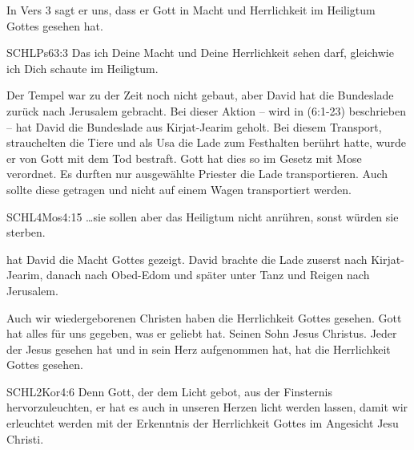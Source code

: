 \documentclass[14pt]{../../inc/mybib}
\begin{document}
    \begin{block}
        In Vers 3 sagt er uns, dass er Gott in Macht und Herrlichkeit im Heiligtum Gottes gesehen hat.
        \begin{bibelbox}{SCHL}{Ps}{63:3}
            Das ich Deine Macht und Deine Herrlichkeit sehen darf, gleichwie ich Dich schaute im Heiligtum.
        \end{bibelbox}
        Der Tempel war zu der Zeit noch nicht gebaut, aber David hat die Bundeslade zurück nach Jerusalem gebracht. Bei dieser Aktion -- wird in (6:1-23) beschrieben -- hat David die Bundeslade aus Kirjat-Jearim geholt. Bei diesem Transport, strauchelten die Tiere und als Usa die Lade zum Festhalten berührt hatte, wurde er von Gott mit dem Tod bestraft. Gott hat dies so im Gesetz mit Mose verordnet. Es durften nur ausgewählte Priester die Lade transportieren. Auch sollte diese getragen und nicht auf einem Wagen transportiert werden.
        \begin{bibelbox}{SCHL}{4Mos}{4:15}
            \dots sie sollen aber das Heiligtum nicht anrühren, sonst würden sie sterben.
        \end{bibelbox}
         hat David die Macht Gottes gezeigt. David brachte die Lade zuserst nach Kirjat-Jearim, danach nach Obed-Edom und später unter Tanz und Reigen nach Jerusalem.
    \end{block}
    \begin{block}
        Auch wir wiedergeborenen Christen haben die Herrlichkeit Gottes gesehen. Gott hat alles für uns gegeben, was er geliebt hat. Seinen Sohn Jesus Christus. Jeder der Jesus gesehen hat und in sein Herz aufgenommen hat, hat die Herrlichkeit Gottes gesehen.
        \begin{bibelbox}{SCHL}{2Kor}{4:6}
            Denn Gott, der dem Licht gebot, aus der Finsternis hervorzuleuchten, er hat es auch in unseren Herzen licht werden lassen, damit wir erleuchtet werden mit der Erkenntnis der Herrlichkeit Gottes im Angesicht Jesu Christi.
        \end{bibelbox}
    \end{block}
\end{document}
